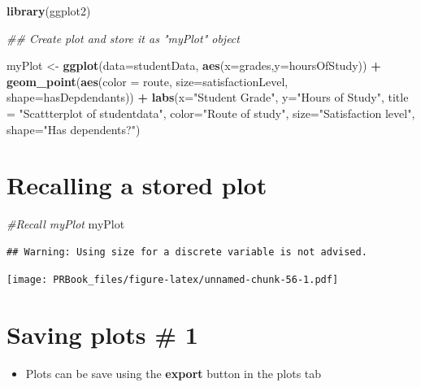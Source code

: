 \documentclass[
]{book}
\newenvironment{Shaded}{\begin{snugshade}}{\end{snugshade}}
\newcommand{\CommentTok}[1]{\textcolor[rgb]{0.56,0.35,0.01}{\textit{#1}}}
\newcommand{\DataTypeTok}[1]{\textcolor[rgb]{0.13,0.29,0.53}{#1}}
\newcommand{\KeywordTok}[1]{\textcolor[rgb]{0.13,0.29,0.53}{\textbf{#1}}}
\newcommand{\NormalTok}[1]{#1}
\newcommand{\OperatorTok}[1]{\textcolor[rgb]{0.81,0.36,0.00}{\textbf{#1}}}
\newcommand{\StringTok}[1]{\textcolor[rgb]{0.31,0.60,0.02}{#1}}
\providecommand{\tightlist}{%
  \setlength{\itemsep}{0pt}\setlength{\parskip}{0pt}}
\begin{document}
\begin{Shaded}
\begin{Highlighting}[]
\KeywordTok{library}\NormalTok{(ggplot2)}

\CommentTok{## Create plot and store it as "myPlot" object}

\NormalTok{myPlot <-}\StringTok{ }\KeywordTok{ggplot}\NormalTok{(}\DataTypeTok{data=}\NormalTok{studentData, }\KeywordTok{aes}\NormalTok{(}\DataTypeTok{x=}\NormalTok{grades,}\DataTypeTok{y=}\NormalTok{hoursOfStudy)) }\OperatorTok{+}
\StringTok{  }\KeywordTok{geom_point}\NormalTok{(}\KeywordTok{aes}\NormalTok{(}\DataTypeTok{color =}\NormalTok{ route, }\DataTypeTok{size=}\NormalTok{satisfactionLevel, }\DataTypeTok{shape=}\NormalTok{hasDepdendants)) }\OperatorTok{+}
\StringTok{  }\KeywordTok{labs}\NormalTok{(}\DataTypeTok{x=}\StringTok{"Student Grade"}\NormalTok{, }\DataTypeTok{y=}\StringTok{"Hours of Study"}\NormalTok{, }\DataTypeTok{title =} \StringTok{"Scattterplot of studentdata"}\NormalTok{, }\DataTypeTok{color=}\StringTok{"Route of study"}\NormalTok{, }\DataTypeTok{size=}\StringTok{"Satisfaction level"}\NormalTok{, }\DataTypeTok{shape=}\StringTok{"Has dependents?"}\NormalTok{)}
\end{Highlighting}
\end{Shaded}

\hypertarget{recalling-a-stored-plot}{%
\section{Recalling a stored plot}\label{recalling-a-stored-plot}}

\begin{Shaded}
\begin{Highlighting}[]
 \CommentTok{#Recall myPlot}
\NormalTok{myPlot}
\end{Highlighting}
\end{Shaded}

\begin{verbatim}
## Warning: Using size for a discrete variable is not advised.
\end{verbatim}

\texttt{[image: PRBook\_files/figure-latex/unnamed-chunk-56-1.pdf]}

\hypertarget{saving-plots-1}{%
\section{Saving plots \# 1}\label{saving-plots-1}}

\begin{itemize}
\tightlist
\item
  Plots can be save using the \textbf{export} button in the plots tab
\end{itemize}
\end{document}
